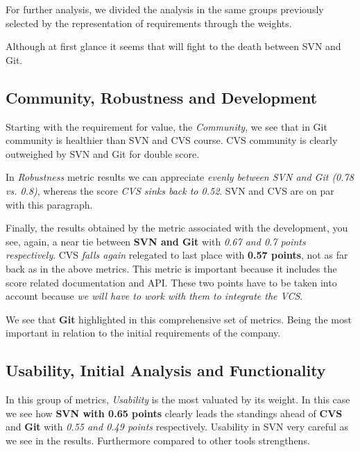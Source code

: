 \documentclass[11pt]{scrartcl}
\begin{document}
\par For further analysis, we divided the analysis in the same groups previously selected by the representation of requirements through the weights.

\par Although at first glance it seems that will fight to the death between SVN and Git.

\subsection{Community, Robustness and Development}\label{sec:compare-com-rob-dev}

\par Starting with the requirement for value, the \emph{Community}, we see that in Git community is healthier than SVN and CVS course. CVS community is clearly outweighed by SVN and Git for double score.

\par In \emph{Robustness} metric results we ​​can appreciate \emph{evenly between SVN and Git (0.78 vs. 0.8)}, whereas the score \emph{CVS sinks back to 0.52}. SVN and CVS are on par with this paragraph.

\par Finally, the results obtained by the metric associated with the development, you see, again, a near tie between \textbf{SVN and Git} with \emph{0.67 and 0.7 points respectively}. CVS \emph{falls again} relegated to last place with \textbf{0.57 points}, not as far back as in the above metrics. This metric is important because it includes the score related documentation and API. These two points have to be taken into account because \emph{we will have to work with them to integrate the VCS}.

\par We see that \textbf{Git} highlighted in this comprehensive set of metrics. Being the most important in relation to the initial requirements of the company.

\subsection{Usability, Initial Analysis and Functionality}\label{sec:compare-usa-ini-func}

\par In this group of metrics, \emph{Usability} is the most valuated by its weight. In this case we see how \textbf{SVN with 0.65 points} clearly leads the standings ahead of \textbf{CVS} and \textbf{Git} with \emph{0.55 and 0.49 points} respectively. Usability in SVN very careful as we see in the results. Furthermore compared to other tools strengthens.
\end{document}
